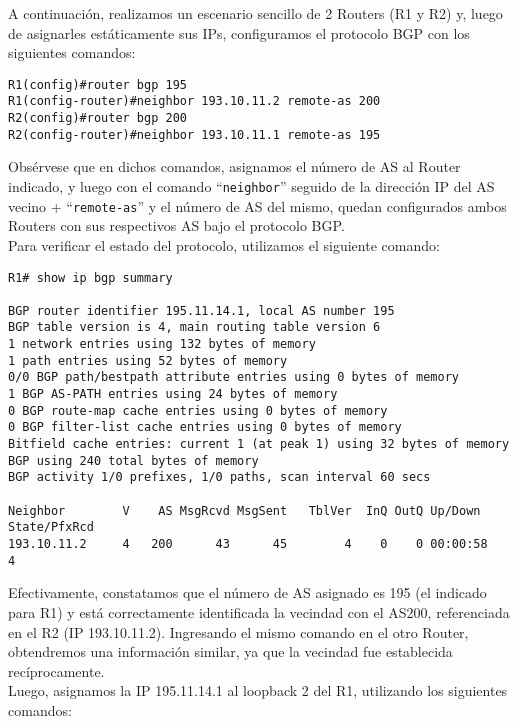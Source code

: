 \documentclass{article}
\begin{document}
A continuaci\'on, realizamos un escenario sencillo de 2 Routers (R1 y R2) y, luego de asignarles est\'aticamente sus IPs, configuramos el protocolo BGP con los siguientes comandos: \\

\begin{verbatim}
R1(config)#router bgp 195					
R1(config-router)#neighbor 193.10.11.2 remote-as 200
R2(config)#router bgp 200
R2(config-router)#neighbor 193.10.11.1 remote-as 195

\end{verbatim}

Obs\'ervese que en dichos comandos, asignamos el n\'umero de AS al Router indicado, y luego con el comando ``\texttt{neighbor}'' seguido de la direcci\'on IP del AS vecino + ``\texttt{remote-as}'' y el n\'umero de AS del mismo, quedan configurados ambos Routers con sus respectivos AS bajo el protocolo BGP. \\

Para verificar el estado del protocolo, utilizamos el siguiente comando:

\begin{verbatim}
R1# show ip bgp summary

BGP router identifier 195.11.14.1, local AS number 195
BGP table version is 4, main routing table version 6
1 network entries using 132 bytes of memory
1 path entries using 52 bytes of memory
0/0 BGP path/bestpath attribute entries using 0 bytes of memory
1 BGP AS-PATH entries using 24 bytes of memory
0 BGP route-map cache entries using 0 bytes of memory
0 BGP filter-list cache entries using 0 bytes of memory
Bitfield cache entries: current 1 (at peak 1) using 32 bytes of memory
BGP using 240 total bytes of memory
BGP activity 1/0 prefixes, 1/0 paths, scan interval 60 secs

Neighbor        V    AS MsgRcvd MsgSent   TblVer  InQ OutQ Up/Down  State/PfxRcd
193.10.11.2     4   200      43      45        4    0    0 00:00:58        4
\end{verbatim}

Efectivamente, constatamos que el n\'umero de AS asignado es 195 (el indicado para R1) y est\'a correctamente identificada la vecindad con el AS200, referenciada en el R2 (IP 193.10.11.2). Ingresando el mismo comando en el otro Router, obtendremos una informaci\'on similar, ya que la vecindad fue establecida rec\'iprocamente. \\

Luego, asignamos la IP 195.11.14.1 al loopback 2 del R1, utilizando los siguientes comandos:
\end{document}
